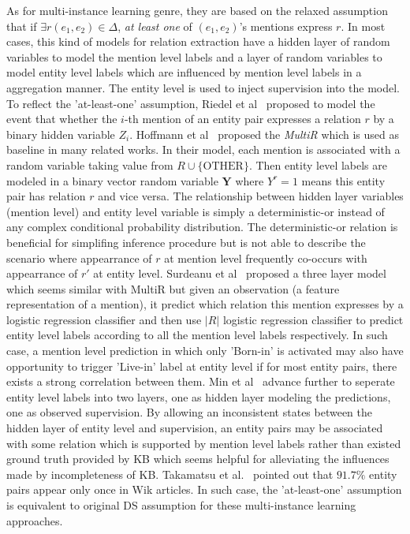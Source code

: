 \documentclass[10pt]{article} %
\theoremstyle{definition}
\theoremstyle{definition}
\begin{document}
As for multi-instance learning genre, they are based on the relaxed assumption that if $\exists r(e_1, e_2)\in\Delta$, \emph{at least one} of $(e_1, e_2)$'s mentions express $r$. 
In most cases, this kind of models for relation extraction have a hidden layer of random variables to model the mention level labels 
and a layer of random variables to model entity level labels which are influenced by mention level labels in a aggregation manner. 
The entity level is used to inject supervision into the model. 
To reflect the 'at-least-one' assumption, Riedel et al~\cite{riedel} proposed to model the event that whether the $i$-th mention of an entity pair expresses a relation $r$ by a binary hidden variable $Z_i$. 
Hoffmann et al~\cite{hoffmann} proposed the \emph{MultiR} which is used as baseline in many related works. 
In their model, each mention is associated with a random variable taking value from $R\cup\{\text{OTHER}\}$. 
Then entity level labels are modeled in a binary vector random variable $\mathbf{Y}$ where $Y^{r}=1$ means this entity pair has relation $r$ and vice versa. 
The relationship between hidden layer variables (mention level) and entity level variable is simply a deterministic-or instead of any complex conditional probability distribution. 
The deterministic-or relation is beneficial for simplifing inference procedure but is not able to describe the scenario where appearrance of $r$ at mention level frequently co-occurs with appearrance of $r'$ at entity level. 
Surdeanu et al~\cite{surdeanu} proposed a three layer model which seems similar with MultiR but given an observation (a feature representation of a mention), it predict which relation this mention expresses by a logistic regression classifier and then use $\vert R\vert$ logistic regression classifier to predict entity level labels according to all the mention level labels respectively. 
In such case, a mention level prediction in which only 'Born-in' is activated may also have opportunity to trigger 'Live-in' label at entity level if for most entity pairs, there exists a strong correlation between them. 
Min et al~\cite{4layers} advance further to seperate entity level labels into two layers, one as hidden layer modeling the predictions, one as observed supervision. 
By allowing an inconsistent states between the hidden layer of entity level and supervision, an entity pairs may be associated with some relation which is supported by mention level labels rather than existed ground truth provided by KB which seems helpful for alleviating the influences made by incompleteness of KB. 
Takamatsu et al.~\cite{takamatsu} pointed out that $91.7\%$ entity pairs appear only once in Wik articles. 
In such case, the 'at-least-one' assumption is equivalent to original DS assumption for these multi-instance learning approaches. 
\end{document}
